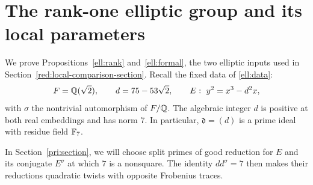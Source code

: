 \section{The rank-one elliptic group and its local parameters}
\label{ell:section}

We prove Propositions~\ref{ell:rank} and~\ref{ell:formal}, the two elliptic
inputs used in Section~\ref{red:local-comparison-section}.  Recall the fixed
data of \eqref{ell:data}:
\[
 F=\mathbb Q(\sqrt2),\qquad d=75-53\sqrt2,\qquad
 E:\ y^2=x^3-d^2x,
\]
with \(\sigma\) the nontrivial automorphism of \(F/\mathbb Q\).  The algebraic integer \(d\)
is positive at both real embeddings and has norm \(7\).  In particular,
\(\mathfrak d=(d)\) is a prime ideal with residue field \(\mathbb F_7\).

In Section~\ref{pri:section}, we will choose split primes of good reduction
for $E$ and its conjugate $E^\sigma$ at which $7$ is a nonsquare. The identity
$dd^\sigma=7$ then makes their reductions quadratic twists with opposite
Frobenius traces.

